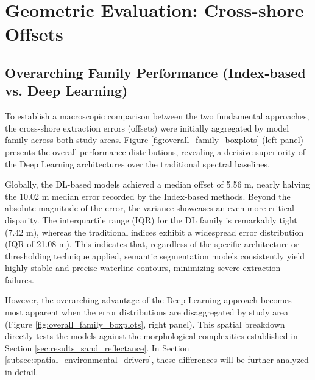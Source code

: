 ﻿\documentclass[ENG]{TFUOC}%
\begin{document}

\section{Geometric Evaluation: Cross-shore Offsets}
\label{sec:results_geometric_eval}

\subsection{Overarching Family Performance (Index-based vs. Deep Learning)}
\label{subsec:overarching_performance}

To establish a macroscopic comparison between the two fundamental approaches, the cross-shore extraction errors (offsets) were initially aggregated by model family across both study areas. Figure \ref{fig:overall_family_boxplots} (left panel) presents the overall performance distributions, revealing a decisive superiority of the Deep Learning architectures over the traditional spectral baselines. 

Globally, the DL-based models achieved a median offset of 5.56 m, nearly halving the 10.02 m median error recorded by the Index-based methods. Beyond the absolute magnitude of the error, the variance showcases an even more critical disparity. The interquartile range (IQR) for the DL family is remarkably tight (7.42 m), whereas the traditional indices exhibit a widespread error distribution (IQR of 21.08 m). This indicates that, regardless of the specific architecture or thresholding technique applied, semantic segmentation models consistently yield highly stable and precise waterline contours, minimizing severe extraction failures.

However, the overarching advantage of the Deep Learning approach becomes most apparent when the error distributions are disaggregated by study area (Figure \ref{fig:overall_family_boxplots}, right panel). This spatial breakdown directly tests the models against the morphological complexities established in Section \ref{sec:results_sand_reflectance}. In Section \ref{subsec:spatial_environmental_drivers}, these differences will be further analyzed in detail.
\end{document}
